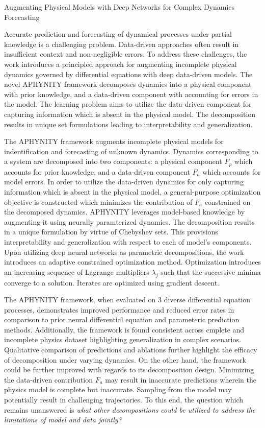 \documentclass[11pt,letterpaper]{article}
\begin{document}
\begin{center}
  \large{Augmenting Physical Models with Deep Networks for Complex Dynamics Forecasting}
\end{center}

Accurate prediction and forecasting of dynamical processes under partial knowledge is a challenging problem. Data-driven approaches often result in insufficient context and non-negligible errors. To address these challenges, the work introduces a principled approach for augmenting incomplete physical dynamics governed by differential equations with deep data-driven models. The novel APHYNITY framework decomposes dynamics into a physical component with prior knowledge, and a data-driven component with accounting for errors in the model. The learning problem aims to utilize the data-driven component for capturing information which is absent in the physical model. The decomposition results in unique set formulations leading to interpretability and generalization.

The APHYNITY framework augments incomplete physical models for indentification and forecasting of unknown dynamics. Dynamics corresponding to a system are decomposed into two components: a physical component $F_{p}$ which accounts for prior knowledge, and a data-driven component $F_{a}$ which accounts for model errors. In order to utilize the data-driven dynamics for only capturing information which is absent in the physical model, a general-purpose optimization objective is constructed which minimizes the contribution of $F_{a}$ constrained on the decomposed dynamics. APHYNITY leverages model-based knowledge by augmenting it using neurally paramterized dynamics. The decomposition results in a unique formulation by virtue of Chebyshev sets. This provisions interpretability and generalization with respect to each of model's components. Upon utilizing deep neural networks as parametric decompositions, the work introduces an adaptive constrained optimization method. Optimization introduces an increasing sequence of Lagrange multipliers $\lambda_{j}$ such that the successive minima converge to a solution. Iterates are optimized using gradient descent.

The APHYNITY framework, when evaluated on 3 diverse differential equation processes, demonstrates improved performance and reduced error rates in comparison to prior neural differential equation and parameteric prediction methods. Additionally, the framework is found consistent across cmplete and incomplete physics dataset highlighting generalization in complex scenarios. Qualitative comparison of predictions and ablations further highlight the efficacy of decomposition under varying dynamics. On the other hand, the framework could be further improved with regards to its decomposition design. Minimizing the data-driven contribution $F_{a}$ may result in inaccurate predictions wherein the physics model is complete but inaccurate. Sampling from the model may potentially result in challenging trajectories. To this end, the question which remains unanswered is \textit{what other decompositions could be utilized to address the limitations of model and data jointly?}
\end{document}
